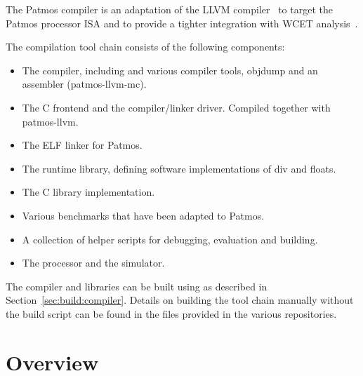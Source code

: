 

The Patmos compiler is an adaptation of the LLVM compiler~\cite{llvm:2004} to
target the Patmos processor ISA and to provide a tighter integration with WCET
analysis~\cite{Seus13:compiler}.

The compilation tool chain consists of the following components:

\begin{itemize}
\item {} The compiler, including  and various compiler tools, objdump and an assembler (patmos-llvm-mc).
\item {} The C frontend and the compiler/linker driver. Compiled together with patmos-llvm.
\item {} The  ELF linker for Patmos.
\item {} The runtime library, defining software implementations of div and floats.
\item {} The C library implementation.
\item {} Various benchmarks that have been adapted to Patmos.
\item {} A collection of helper scripts for debugging, evaluation and building.
\item {} The processor and the simulator.
\end{itemize}

The compiler and libraries can be built using  as described
in Section~\ref{sec:build:compiler}.  Details on building the tool chain
manually without the build script can be found in the 
files provided in the various repositories.


\section{Overview}

